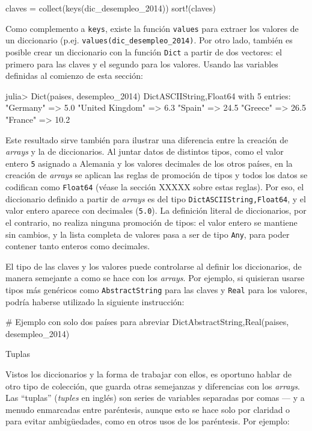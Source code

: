 ﻿\documentclass{article}
\newcommand{\jl}{\texttt}
\begin{document}
{claves = collect(keys(dic_desempleo_2014))
sort!(claves)

Como complemento a \jl{keys}, existe la función \jl{values} para extraer los valores de un diccionario (p.ej. \jl{values(dic_desempleo_2014)}. Por otro lado, también es posible crear un diccionario con la función \jl{Dict} a partir de dos vectores: el primero para las claves y el segundo para los valores. Usando las variables definidas al comienzo de esta sección:

julia> Dict(paises, desempleo_2014)
Dict{ASCIIString,Float64} with 5 entries:
  "Germany"        => 5.0
  "United Kingdom" => 6.3
  "Spain"          => 24.5
  "Greece"         => 26.5
  "France"         => 10.2

Este resultado sirve también para ilustrar una diferencia entre la creación de \emph{arrays} y la de diccionarios. Al juntar datos de distintos tipos, como el valor entero \jl{5} asignado a Alemania y los valores decimales de los otros países, en la creación de \emph{arrays} se aplican las reglas de promoción de tipos y todos los datos se codifican como \jl{Float64} (véase la sección XXXXX sobre estas reglas). Por eso, el diccionario definido a partir de \emph{arrays} es del tipo \jl{Dict{ASCIIString,Float64}}, y el valor entero aparece con decimales (\jl{5.0}). La definición literal de diccionarios, por el contrario, no realiza ninguna promoción de tipos: el valor entero se mantiene sin cambios, y la lista completa de valores pasa a ser de tipo \jl{Any}, para poder contener tanto enteros como decimales.

El tipo de las claves y los valores puede controlarse al definir los diccionarios, de manera semejante a como se hace con los \emph{arrays}. Por ejemplo, si quisieran usarse tipos más genéricos como \jl{AbstractString} para las claves y \jl{Real} para los valores, podría haberse utilizado la siguiente instrucción:

# Ejemplo con solo dos países para abreviar
Dict{AbstractString,Real}(paises, desempleo_2014)



Tuplas

Vistos los diccionarios y la forma de trabajar con ellos, es oportuno hablar de otro tipo de colección, que guarda otras semejanzas y diferencias con los \emph{arrays}. Las ``tuplas'' (\emph{tuples} en inglés) son series de variables separadas por comas --- y a menudo enmarcadas entre paréntesis, aunque esto se hace solo por claridad o para evitar ambigüedades, como en otros usos de los paréntesis. Por ejemplo:

}
\end{document}
